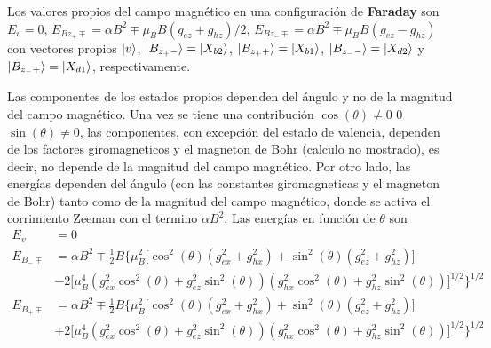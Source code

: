 \documentclass[main.tex]{subfiles}
\begin{document}
Los valores propios del campo magnético en una configuración de \textbf{Faraday} son $E_v=0$, $E_{Bz_+\mp} = \alpha B^2 \mp \mu_B B(g_{ez}+g_{hz})/2$, $E_{Bz_-\mp} = \alpha B^2 \mp \mu_B B (g_{ez} - g_{hz})$ con vectores propios $\ket{v}$, $\ket{B_{z_+-}} = \ket{X_{b2}}$, $\ket{B_{z_++}} = \ket{X_{b1}}$, $\ket{B_{z_--}} = \ket{X_{d2}}$ y $\ket{B_{z_-+}} = \ket{X_{d1}}$, respectivamente.

Las componentes de los estados propios dependen del ángulo y no de la magnitud del campo magnético. Una vez se tiene una contribución $\cos(\theta)\neq 0$ 0 $\sin(\theta)\neq 0$, las componentes, con excepción del estado de valencia, dependen de los factores giromagneticos y el magneton de Bohr (calculo no mostrado), es decir, no depende de la magnitud del campo magnético. Por otro lado, las energías dependen del ángulo (con las constantes giromagneticas y el magneton de Bohr) tanto como de la  magnitud del campo magnético, donde se activa el corrimiento Zeeman con el termino $\alpha B^2$. Las energías en función de $\theta$ son
\begin{align*}
    E_v &= 0\\
    E_{B_-\mp} &= \alpha B^2 \mp \tfrac{1}{2} B \big\{\mu_B^2 \big[\cos ^2(\theta ) \left(g_{ex}^2+g_{hx}^2\right)+\sin ^2(\theta ) \left(g_{ez}^2+g_{hz}^2\right) \big] \\
    &- 2 \big[\mu_B^4 \left(g_{ex}^2 \cos ^2(\theta )+g_{ez}^2 \sin ^2(\theta )\right) \left(g_{hx}^2 \cos ^2(\theta )+g_{hz}^2 \sin ^2(\theta )\right) \big]^{1/2} \big \}^{1/2}\\
    E_{B_+\mp} &= \alpha B^2 \mp \tfrac{1}{2} B \big\{\mu_B^2 \big[\cos ^2(\theta ) \left(g_{ex}^2+g_{hx}^2\right)+\sin ^2(\theta ) \left(g_{ez}^2+g_{hz}^2\right) \big] \\
    &+ 2 \big[\mu_B^4 \left(g_{ex}^2 \cos ^2(\theta )+g_{ez}^2 \sin ^2(\theta )\right) \left(g_{hx}^2 \cos ^2(\theta )+g_{hz}^2 \sin ^2(\theta )\right) \big]^{1/2} \big \}^{1/2}
\end{align*}
\end{document}
